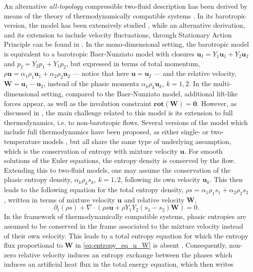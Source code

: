 \documentclass{myclass}
\newcommand{\vel}{\bm{u}}
\newcommand{\pth}[1]  {\left( #1 \right)}
\newcommand{\rot}{\mathbf{rot}}
\begin{document}
An alternative \textit{all-topology} compressible two-fluid description \cite{romenski:2004, romenski:2007, romenski:2010} has been derived by means of the theory of thermodynamically compatible systems \cite{godunov:1961, godunov:1996, romensky:1998, ferrari:2025}. In its barotropic version, the model has been extensively studied \cite{thein:2022a,thein:2022b}, while an alternative derivation, and its extension to include velocity fluctuations, through Stationary Action Principle can be found in \cite{haegeman_RelVel:2025}. In the mono-dimensional setting, the barotropic model is equivalent to a barotropic Baer-Nunziato model with closures $\vel_I = Y_1\vel_1 +Y_2\vel_2$ and $p_I = Y_2 p_1 + Y_1 p_2$, but expressed in terms of total momentum, $\rho \vel = \alpha_1\rho_1 \vel_1 + \alpha_2\rho_2\vel_2$ --- notice that here $\vel=\vel_I$ --- and the relative velocity, $\bm{W}=\vel_1-\vel_2$, instead of the phasic momenta $\alpha_k\rho_k\vel_k$, $k=1,2$. In the multi-dimensional setting, compared to the Baer-Nunziato model, additional lift-like forces appear, as well as the involution constraint $\rot(\bm{W})=\bm{0}$. However, as discussed in \cite{haegeman_RelVel:2025}, the main challenge related to this model is its extension to full thermodynamics, i.e. to non-barotropic flows. Several versions of the model which include full thermodynamics have been proposed, as either single- or two-temperature models \cite{romenski:2004,romenski:2007,romenski:2010}, but all share the same type of underlying assumption, which is the conservation of entropy with mixture velocity $\vel$. For smooth solutions of the Euler equations, the entropy density is conserved by the flow. Extending this to two-fluid models, one may assume the conservation of the phasic entropy density, $\alpha_k \rho_k s_k$, $k=1,2$, following its own velocity $\vel_k$. This then leads to the following equation for the total entropy density, $\rho s = \alpha_1 \rho_1 s_1 + \alpha_2 \rho_2 s_2$, written in terms of mixture velocity $\vel$ and relative velocity $\bm{W}$,
\begin{equation}
\partial_t\pth{\rho s} + \nabla\cdot\pth{\rho s \vel + \rho Y_1 Y_2 (s_1 - s_2)\bm{W}} = 0.
\label{eq:entropy_eq_u_W}
\end{equation}
In the framework of thermodynamically compatible systems, phasic entropies are assumed to be conserved in the frame associated to the mixture velocity instead of their own velocity. This leads to a total entropy equation for which the entropy flux proportional to $\bm{W}$ in \eqref{eq:entropy_eq_u_W} is absent \cite{romenski:2004,romenski:2007,romenski:2010,laspina:2017}. Consequently, non-zero relative velocity induces an entropy exchange between the phases which induces an artificial heat flux in the total energy equation, which then writes 
\end{document}
